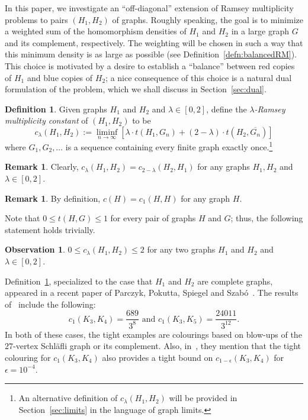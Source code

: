 \documentclass[12pt]{article}
\numberwithin{equation}{section}
\theoremstyle{definition}
\newtheorem{defn}[equation]{Definition}
\newtheorem{rem}[equation]{Remark}
\newtheorem{obs}[equation]{Observation}
\theoremstyle{remark}
\begin{document}
In this paper, we investigate an ``off-diagonal'' extension of Ramsey multiplicity problems to pairs $(H_1,H_2)$ of graphs. Roughly speaking, the goal is to minimize a weighted sum of the homomorphism densities of $H_1$ and $H_2$ in a large graph $G$ and its complement, respectively. The weighting will be chosen in such a way that this minimum density is as large as possible (see Definition~\ref{defn:balancedRM}). This choice is motivated by a desire to establish a ``balance'' between red copies of $H_1$ and blue copies of $H_2$; a nice consequence of this choice is a natural dual formulation of the problem, which we shall discuss in Section~\ref{sec:dual}.

\begin{defn}
\label{defn:lambdaRM}
Given graphs $H_1$ and $H_2$ and $\lambda\in [0,2]$, define the \emph{$\lambda$-Ramsey multiplicity constant} of $(H_1,H_2)$ to be 
\[c_\lambda(H_1,H_2):=\liminf_{n\to\infty}\left[\lambda \cdot t(H_1,G_n)+ (2-\lambda)\cdot t(H_2,\overline{G_n})\right]\]
where $G_1,G_2,\dots$ is a sequence containing every finite graph exactly once.\footnote{An alternative definition of $c_\lambda(H_1,H_2)$ will be provided in Section~\ref{sec:limits} in the language of graph limits.}
\end{defn}

\begin{rem}
\label{rem:swap}
Clearly, $c_\lambda(H_1,H_2)=c_{2-\lambda}(H_2,H_1)$ for any graphs $H_1,H_2$ and $\lambda\in[0,2]$.
\end{rem}

\begin{rem}
\label{rem:c_1(H,H)}
By definition, $c(H)=c_1(H,H)$ for any graph $H$.
\end{rem}

Note that $0\leq t(H,G)\leq1$ for every pair of graphs $H$ and $G$; thus, the following statement holds trivially. 

\begin{obs}
\label{obs:02}
$0\leq c_\lambda(H_1,H_2)\leq2$ for any two graphs $H_1$ and $H_2$ and $\lambda\in[0,2]$. 
\end{obs}

Definition~\ref{defn:lambdaRM}, specialized to the case that $H_1$ and $H_2$ are complete graphs, appeared in a recent paper of Parczyk, Pokutta, Spiegel and Szab\'o~\cite[Equation~(15)]{ParczykPokuttaSpiegelSzabo25}. The results of~\cite{ParczykPokuttaSpiegelSzabo25} include the following:
\[c_1(K_3,K_4)=\frac{689}{3^8}\text{ and }c_1(K_3,K_5)=\frac{24011}{3^{12}}.\]
In both of these cases, the tight examples are colourings based on blow-ups of the $27$-vertex Schl\"afli graph or its complement. Also, in~\cite[Section~4.3]{ParczykPokuttaSpiegelSzabo25}, they mention that the tight colouring for $c_1(K_3,K_4)$ also provides a tight bound on $c_{1-\epsilon}(K_3,K_4)$ for $\epsilon=10^{-4}$.
\end{document}
